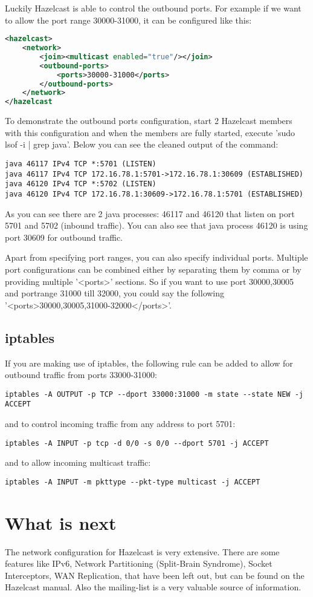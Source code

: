 Luckily Hazelcast is able to control the outbound ports. For example if we want to allow the port range 30000-31000, it can be configured like this:
\begin{lstlisting}[language=xml]
<hazelcast>
    <network>
        <join><multicast enabled="true"/></join>
        <outbound-ports>
            <ports>30000-31000</ports>
        </outbound-ports>
    </network>
</hazelcast
\end{lstlisting}
To demonstrate the outbound ports configuration, start 2 Hazelcast members with this configuration and when the members are fully started, execute 'sudo lsof -i | grep java'. Below you can see the cleaned output of the command:
\begin{lstlisting}
java 46117 IPv4 TCP *:5701 (LISTEN)
java 46117 IPv4 TCP 172.16.78.1:5701->172.16.78.1:30609 (ESTABLISHED)
java 46120 IPv4 TCP *:5702 (LISTEN)
java 46120 IPv4 TCP 172.16.78.1:30609->172.16.78.1:5701 (ESTABLISHED)
\end{lstlisting}
As you can see there are 2 java processes: 46117 and 46120 that listen on port 5701 and 5702 (inbound traffic). You can also see that java process 46120 is using port 30609 for outbound traffic.

Apart from specifying port ranges, you can also specify individual ports. Multiple port configurations can be combined either by separating them by comma or by providing multiple '<ports>' sections. So if you want to use port 30000,30005 and portrange 31000 till 32000, you could say the following '<ports>30000,30005,31000-32000</ports>'. 

\subsection{iptables}
If you are making use of iptables, the following rule can be added to allow for outbound traffic from ports 33000-31000:
\begin{lstlisting}
iptables -A OUTPUT -p TCP --dport 33000:31000 -m state --state NEW -j ACCEPT
\end{lstlisting}
and to control incoming traffic from any address to port 5701:
\begin{lstlisting}
iptables -A INPUT -p tcp -d 0/0 -s 0/0 --dport 5701 -j ACCEPT
\end{lstlisting}
and to allow incoming multicast traffic:
\begin{lstlisting}
iptables -A INPUT -m pkttype --pkt-type multicast -j ACCEPT
\end{lstlisting}



\section{What is next}
The network configuration for Hazelcast is very extensive. There are some features like IPv6,  Network Partitioning (Split-Brain Syndrome), Socket Interceptors, WAN Replication, that have been left out, but can be found on the Hazelcast manual. Also the mailing-list is a very valuable source of information.

